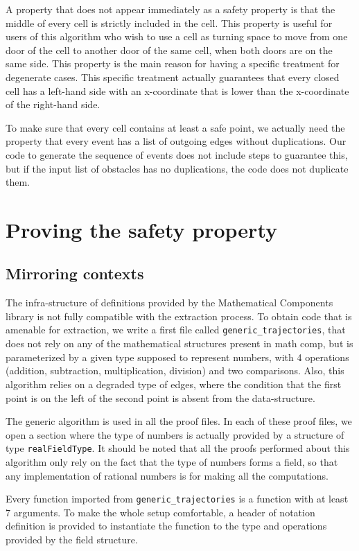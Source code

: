 \documentclass[a4paper, USenglish, cleveref, autoref, thm-restate]{lipics-v2021}
\begin{document}
A property that does not appear immediately as a safety property is
that the middle of every cell is strictly included in the cell.  This
property is useful for users of this algorithm who wish to use a cell
as turning space to move from one door of the cell to another door of
the same cell, when both doors are on the same side.  This property is
the main reason for having a specific treatment for degenerate cases.
This specific treatment actually guarantees that every closed cell has
a left-hand side with an x-coordinate that is lower than the
x-coordinate of the right-hand side.

To make sure that every cell contains at least a safe point, we
actually need the property that every event has a list of outgoing
edges without duplications.  Our code to generate the sequence of
events does not include steps to guarantee this, but if the input
list of obstacles has no duplications, the code does not duplicate them.

\section{Proving the safety property}
\subsection{Mirroring contexts}
The infra-structure of definitions provided by the Mathematical
Components library is not fully compatible with the extraction
process.  To obtain code that is amenable for extraction, we write a
first file called {\tt generic\_trajectories}, that does not rely on
any of the mathematical structures present in math comp, but is
parameterized by a given type supposed to represent numbers, with 4
operations (addition, subtraction, multiplication, division) and two
comparisons.  Also, this algorithm relies on a degraded type of edges,
where the condition that the first point is on the left of the second
point is absent from the data-structure.

The generic algorithm is used in all the proof files.  In each of
these proof files, we open a section where the type of numbers is
actually provided by a structure of type {\tt realFieldType}.  It
should be noted that all the proofs performed about this algorithm
only rely on the fact that the type of numbers forms a field, so that
any implementation of rational numbers is for making all the
computations.

Every function imported from {\tt generic\_trajectories} is a function
with at least 7 arguments.  To make the whole setup comfortable, a
header of notation definition is provided to instantiate the function
to the type and operations provided by the field structure.
\end{document}
